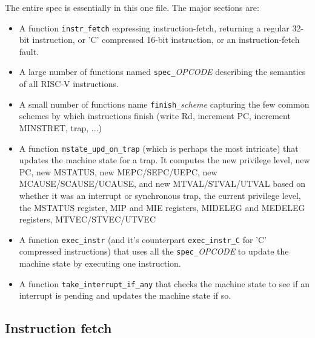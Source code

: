 \documentclass[11pt]{article}
\begin{document}
The entire spec is essentially in this one file.  The major sections
are:
\begin{itemize}

\item A function \verb|instr_fetch| expressing instruction-fetch,
    returning a regular 32-bit instruction, or 'C' compressed 16-bit
    instruction, or an instruction-fetch fault.

\item A large number of functions named \verb|spec_|{\it{}OPCODE}
describing the semantics of all RISC-V instructions.

\item A small number of functions name \verb|finish_|{\it{}scheme}
capturing the few common schemes by which instructions finish (write
Rd, increment PC, increment MINSTRET, trap, ...)

\item A function \verb|mstate_upd_on_trap| (which is perhaps the most
intricate) that updates the machine state for a trap.  It computes the
new privilege level, new PC, new MSTATUS, new MEPC/{\linebreak[0]}SEPC/{\linebreak[0]}UEPC, new
MCAUSE/{\linebreak[0]}SCAUSE/{\linebreak[0]}UCAUSE, and new MTVAL/{\linebreak[0]}STVAL/{\linebreak[0]}UTVAL based on whether
it was an interrupt or synchronous trap, the current privilege level,
the MSTATUS register, MIP and MIE registers, MIDELEG and MEDELEG
registers, MTVEC/{\linebreak[0]}STVEC/{\linebreak[0]}UTVEC

\item A function \verb|exec_instr| (and it's counterpart
\verb|exec_instr_C| for 'C' compressed instructions) that uses all the
\verb|spec_|{\it{}OPCODE} to update the machine state by executing one
instruction.

\item A function \verb|take_interrupt_if_any| that checks the machine
state to see if an interrupt is pending and updates the machine state
if so.

\end{itemize}


\subsection{Instruction fetch}
\end{document}
